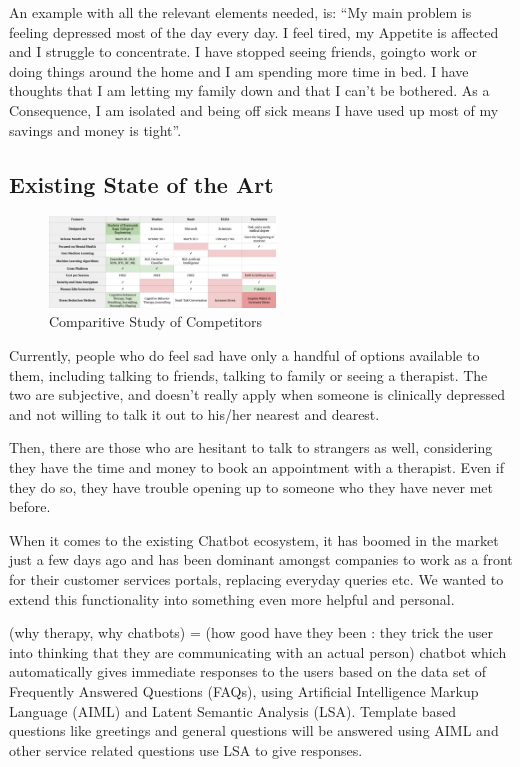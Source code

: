 \documentclass[conference,compsoc]{IEEEtran}
\begin{document}
An example with all the relevant elements needed, is:
``My main problem is feeling depressed most of the day every day. I feel tired, my Appetite is affected and I struggle to concentrate. I have stopped seeing friends, goingto work or doing things around the home and I am spending more time in bed. I have thoughts that I am letting my family down and that I can't be bothered. As a Consequence, I am isolated and being off sick means I have used up most of my savings and money is tight''.

\subsection{Existing State of the Art}

\begin{figure}[H]
    \centering
    \includegraphics[width=6cm]{images/comparitive-study-of-competitors.png}
    \caption{Comparitive Study of Competitors}
    \label{fig:comparitive-study-of-competitors}
\end{figure}

Currently, people who do feel sad have only a handful of options available to them, including talking to friends, talking to family or seeing a therapist. The two are subjective, and doesn’t really apply when someone is clinically depressed and not willing to talk it out to his/her nearest and dearest.

Then, there are those who are hesitant to talk to strangers as well, considering they have the time and money to book an appointment with a therapist. Even if they do so, they have trouble opening up to someone who they have never met before.

When it comes to the existing Chatbot ecosystem, it has boomed in the market just a few days ago and has been dominant amongst companies to work as a front for their customer services portals, replacing everyday queries etc. We wanted to extend this functionality into something even more helpful and personal.

(why therapy, why chatbots) = (how good have they been : they trick the user into thinking that they are communicating with an actual person) chatbot which automatically gives immediate responses to the users based on the data set of Frequently Answered Questions (FAQs), using Artificial Intelligence Markup Language (AIML) and Latent Semantic Analysis (LSA). Template based questions like greetings and general questions will be answered using AIML and other service related questions use LSA to give responses.
\end{document}
